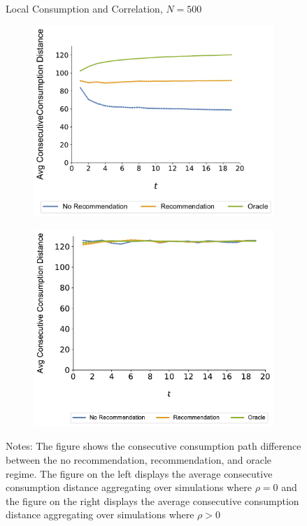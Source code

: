 \documentclass[format=acmsmall, review=true]{acmart}
\begin{document}
\begin{figure}[H]
\caption{Local Consumption and Correlation, $N = 500$}
\begin{subfigure}{.5\linewidth}
  \centering
  \includegraphics[width=.9\linewidth]{figures/rho_pos_consumption_dist_N_500T_20_overall.pdf}
  \label{fig:sfig1}
\end{subfigure}%
\begin{subfigure}{.5\linewidth}
  \centering
  \includegraphics[width=.9\linewidth]{figures/rho_zero_consumption_dist_N_500T_20_overall.pdf}
  \label{fig:sfig2}
\end{subfigure}
\caption*{\scriptsize Notes: The figure shows the consecutive consumption path difference between the no recommendation, recommendation, and oracle regime. The figure on the left displays the average consecutive consumption distance aggregating over simulations where $\rho = 0$ and the figure on the right displays the average consecutive consumption distance aggregating over simulations where $\rho > 0$}
\label{fig:correlation_consumption_path_n_100}
\end{figure}

\end{document}
